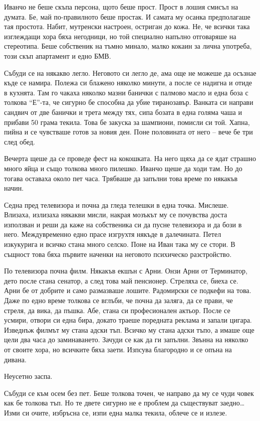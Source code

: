 \documentclass[ebook,openany,12pt]{memoir}
\begin{document}
Иванчо не беше скъпа персона, щото беше прост. Прост в лошия смисъл на думата. Бе, май по-правилното беше простак. И самата му осанка предполагаше тая простота. Набит, мутренски настроен, остриган до кожа. Не, че всички така изглеждащи хора бяха негодници, но той специално напълно отговаряше на стереотипа. Беше собственик на тъмно минало, малко кокаин за лична употреба, този скъп апартамент и едно БМВ.

Събуди се на някакво легло. Неговото си легло де, ама още не можеше да осъзнае къде се намира. Полежа си блажено няколко минути, а после се надигна и отиде в кухнята. Там го чакаха няколко мазни банички с палмово масло и една боза с толкова ``Е''-та, че сигурно бе способна да убие тиранозавър. Ванката си направи сандвич от две банички и трета между тях, сипа бозата в една голяма чаша и прибави 50 грама текила. Това бе закуска за шампиони, помисли си той. Хапна, пийна и се чувстваше готов за новия ден. Поне половината от него – вече бе три след обед. 

Вечерта щеше да се проведе фест на кокошката. На него щяха да се ядат страшно много яйца и също толкова много пилешко. Иванчо щеше да ходи там. Но до тогава оставаха около пет часа. Трябваше да запълни това време по някакъв начин. 

Седна пред телевизора и почна да гледа телешки в една точка. Мислеше. Влизаха, излизаха някакви мисли, накрая мозъкът му се почувства доста използван и реши да каже на собственика си да пусне телевизора и да бози в него. Междувременно едно прасе изгрухтя някъде в далечината. Петел изкукурига и всичко стана много селско. Поне на Иван така му се стори. В същност това бяха първите наченки на неговото психическо разстройство.

По телевизора почна филм. Някакъв екшън с Арни. Онзи Арни от Терминатор, дето после стана сенатор, а след това май пенсионер. Стреляха се, биеха се. Арни бе от добрите и само размазваше лошите. Радомирски се подкефи на това. Даже по едно време толкова се вглъби, че почна да заляга, да се прави, че стреля, да вика, да пъшка. Абе, стана си професионален актьор. После се усмири, отвори си една бира, докато траеше поредната реклама и запали цигара. Изведнъж филмът му стана адски тъп. Всичко му стана адски тъпо, а имаше още цели два часа до заминаването. Зачуди се как да ги запълни. Звънна на няколко от своите хора, но всичките бяха заети. Изпсува благородно и се опъна на дивана.

Неусетно заспа.

Събуди се към осем без пет. Беше толкова точен, че направо да му се чуди човек как бе толкова тъп. Но те двете сигурно не е проблем да съществуват заедно\ldots Изми си очите, избръсна се, изпи една малка текила, облече се и излезе.
\end{document}
